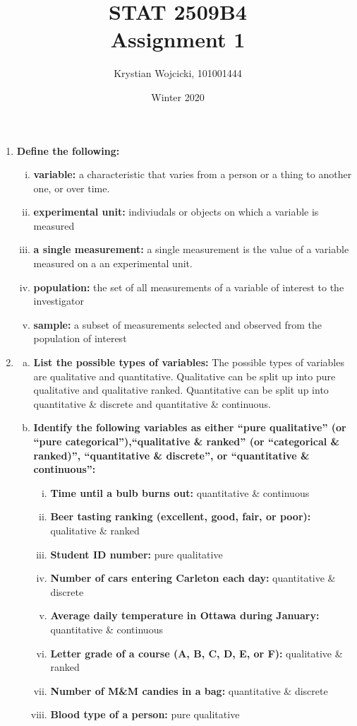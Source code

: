 \documentclass{article}
\title{STAT 2509B4 \\
	\large{Assignment 1}}
\author{Krystian Wojcicki, 101001444}
\date{Winter 2020}
\begin{document}
\maketitle

\begin{enumerate}[1.]
\item

\textbf{Define the following:}
\begin{enumerate}[(i)]
  \item \textbf{variable: } a characteristic that varies from a person or a thing to another one, or over time.
  \item \textbf{experimental unit: } indiviudals or objects on which a variable is measured
  \item \textbf{a single measurement: } a single measurement is the value of a variable measured on a an experimental unit.
  \item \textbf{population: } the set of all measurements of a variable of interest to the investigator
  \item \textbf{sample: } a subset of measurements selected and observed from the population of interest

\end{enumerate}

\item
\begin{enumerate}[(a)]
\item
\textbf{List the possible types of variables:} The possible types of variables are qualitative and quantitative. Qualitative can be split up into pure qualitative and qualitative ranked. Quantitative can be split up into quantitative \& discrete and quantitative \& continuous.

\item
\textbf{Identify the following variables as either “pure qualitative” (or “pure categorical”),“qualitative \& ranked” (or “categorical \& ranked)”, “quantitative \& discrete”, or “quantitative \& continuous”:}
\begin{enumerate}[(i)]
  \item \textbf{Time until a bulb burns out: } quantitative \& continuous
  \item \textbf{Beer tasting ranking (excellent, good, fair, or poor): } qualitative \& ranked
  \item \textbf{Student ID number: } pure qualitative
  \item \textbf{Number of cars entering Carleton each day: } quantitative \& discrete
  \item \textbf{Average daily temperature in Ottawa during January: } quantitative \& continuous
  \item \textbf{Letter grade of a course (A, B, C, D, E, or F): } qualitative \& ranked
  \item \textbf{Number of M\&M candies in a bag: } quantitative \& discrete
  \item \textbf{Blood type of a person: } pure qualitative
\end{enumerate}
\end{enumerate}


\end{enumerate}
\end{document}
